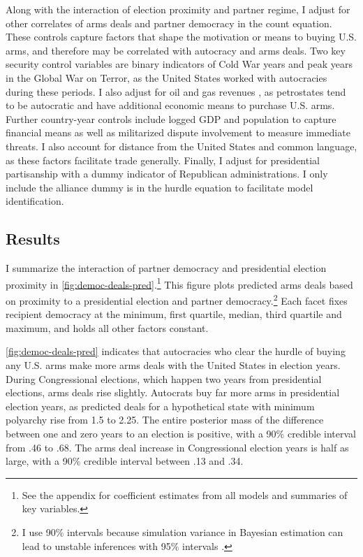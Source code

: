 \documentclass[12pt]{article}
\begin{document}
Along with the interaction of election proximity and partner regime, I adjust for other correlates of arms deals and partner democracy in the count equation. 
These controls capture factors that shape the motivation or means to buying U.S. arms, and therefore may be correlated with autocracy and arms deals. 
Two key security control variables are binary indicators of Cold War years and peak years in the Global War on Terror, as the United States worked with autocracies during these periods. 
I also adjust for oil and gas revenues \citep{RossMahdavi2015}, as petrostates tend to be autocratic and have additional economic means to purchase U.S. arms.
Further country-year controls include logged GDP and population to capture financial means as well as militarized dispute involvement to measure immediate threats.
I also account for distance from the United States and common language, as these factors facilitate trade generally. 
Finally, I adjust for presidential partisanship with a dummy indicator of Republican administrations.  
I only include the alliance dummy is in the hurdle equation to facilitate model identification.


\subsection{Results}


I summarize the interaction of partner democracy and presidential election proximity in \autoref{fig:democ-deals-pred}.\footnote{See the appendix for coefficient estimates from all models and summaries of key variables.}
This figure plots predicted arms deals based on proximity to a presidential election and partner democracy.\footnote{I use 90\% intervals because simulation variance in Bayesian estimation can lead to unstable inferences with 95\% intervals \citep{McElreath2016}.}
Each facet fixes recipient democracy at the minimum, first quartile, median, third quartile and maximum, and holds all other factors constant.


\autoref{fig:democ-deals-pred} indicates that autocracies who clear the hurdle of buying any U.S. arms make more arms deals with the United States in election years.
During Congressional elections, which happen two years from presidential elections, arms deals rise slightly. 
Autocrats buy far more arms in presidential election years, as predicted deals for a hypothetical state with minimum polyarchy rise from 1.5 to 2.25. 
The entire posterior mass of the difference between one and zero years to an election is positive, with a 90\% credible interval from .46 to .68.
The arms deal increase in Congressional election years is half as large, with a 90\% credible interval between .13 and .34. 
\end{document}
